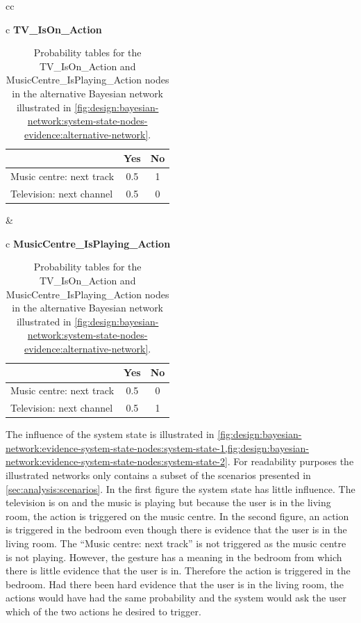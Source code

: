 \begin{table}[h!]
\centering
\caption{Probability tables for the TV\_IsOn\_Action and MusicCentre\_IsPlaying\_Action nodes in the alternative Bayesian network illustrated in \cref{fig:design:bayesian-network:system-state-nodes-evidence:alternative-network}.}
\label{tbl:design:bayesian-network:system-state-nodes-evidence:alternative-system-state}
\begin{tabular}{cc}
\begin{tabular}{c}
\textbf{TV\_IsOn\_Action}   \\
\begin{tabular}{l|cc}
~ & Yes   & No \\ \hline
Music centre: next track & 0.5 & 1 \\
Television: next channel & 0.5 & 0
\end{tabular}
\end{tabular}
&
\begin{tabular}{c}
\textbf{MusicCentre\_IsPlaying\_Action}   \\
\begin{tabular}{l|cc}
~ & Yes   & No \\ \hline
Music centre: next track & 0.5 & 0 \\
Television: next channel & 0.5 & 1
\end{tabular}
\end{tabular}
\end{tabular}
\end{table}

The influence of the system state is illustrated in \cref{fig:design:bayesian-network:evidence-system-state-nodes:system-state-1,fig:design:bayesian-network:evidence-system-state-nodes:system-state-2}. For readability purposes the illustrated networks only contains a subset of the scenarios presented in \cref{sec:analysis:scenarios}. In the first figure the system state has little influence. The television is on and the music is playing but because the user is in the living room, the action is triggered on the music centre. In the second figure, an action is triggered in the bedroom even though there is evidence that the user is in the living room. The ``Music centre: next track'' is not triggered as the music centre is not playing. However, the gesture has a meaning in the bedroom from which there is little evidence that the user is in. Therefore the action is triggered in the bedroom. Had there been hard evidence that the user is in the living room, the actions would have had the same probability and the system would ask the user which of the two actions he desired to trigger.


